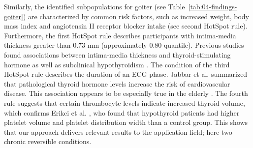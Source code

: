 \documentclass[
  oneside]{book}
\begin{document}
Similarly, the identified subpopulations for goiter (see Table~\ref{tab:04-findings-goiter}) are characterized by common risk factors, such as increased weight, body mass index and angiotensin II receptor blocker intake (see second HotSpot rule).
Furthermore, the first HotSpot rule describes participants with intima-media thickness greater than 0.73 mm (approximately 0.80-quantile).
Previous studies found associations between intima-media thickness and thyroid-stimulating hormone \autocite{takamura2009thyroid} as well as subclinical hypothyroidism \autocite{gao2013carotid,unal2017association}.
The condition of the third HotSpot rule describes the duration of an ECG phase.
Jabbar et al. \autocite{jabbar2017thyroid} summarized that pathological thyroid hormone levels increase the risk of cardiovascular disease.
This association appears to be especially true in the elderly \autocite{fazio2004effects}.
The fourth rule suggests that certain thrombocyte levels indicate increased thyroid volume, which confirms Erikci et al. \autocite{erikci2009effect}, who found that hypothyroid patients had higher platelet volume and platelet distribution width than a control group.
This shows that our approach delivers relevant results to the application field; here two chronic reversible conditions.
\end{document}
